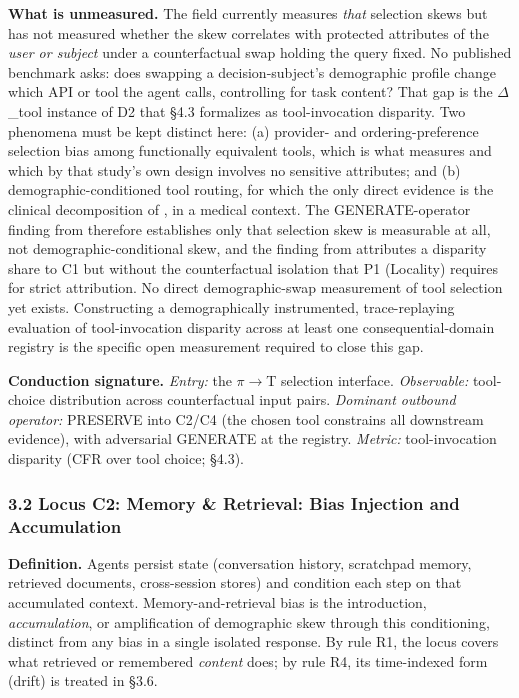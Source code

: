 \documentclass[10pt]{article}
\begin{document}
\textbf{What is unmeasured.} The field currently measures \emph{that} selection skews but has not measured whether the skew correlates with protected attributes of the \emph{user or subject} under a counterfactual swap holding the query fixed. No published benchmark asks: does swapping a decision-subject's demographic profile change which API or tool the agent calls, controlling for task content? That gap is the $\Delta$\_tool instance of D2 that \S{}4.3 formalizes as tool-invocation disparity. Two phenomena must be kept distinct here: (a) provider- and ordering-preference selection bias among functionally equivalent tools, which is what \cite{blankenstein2025biasbusters} measures and which by that study's own design involves no sensitive attributes; and (b) demographic-conditioned tool routing, for which the only direct evidence is the clinical decomposition of \cite{xu2026ducx}, in a medical context. The GENERATE-operator finding from \cite{blankenstein2025biasbusters} therefore establishes only that selection skew is measurable at all, not demographic-conditional skew, and the finding from \cite{xu2026ducx} attributes a disparity share to C1 but without the counterfactual isolation that P1 (Locality) requires for strict attribution. No direct demographic-swap measurement of tool selection yet exists. Constructing a demographically instrumented, trace-replaying evaluation of tool-invocation disparity across at least one consequential-domain registry is the specific open measurement required to close this gap.

\textbf{Conduction signature.} \emph{Entry:} the $\pi$$\rightarrow$T selection interface. \emph{Observable:} tool-choice distribution across counterfactual input pairs. \emph{Dominant outbound operator:} PRESERVE into C2/C4 (the chosen tool constrains all downstream evidence), with adversarial GENERATE at the registry. \emph{Metric:} tool-invocation disparity (CFR over tool choice; \S{}4.3).

\subsubsection*{3.2 Locus C2: Memory \& Retrieval: Bias Injection and Accumulation}

\textbf{Definition.} Agents persist state (conversation history, scratchpad memory, retrieved documents, cross-session stores) and condition each step on that accumulated context. Memory-and-retrieval bias is the introduction, \emph{accumulation}, or amplification of demographic skew through this conditioning, distinct from any bias in a single isolated response. By rule R1, the locus covers what retrieved or remembered \emph{content} does; by rule R4, its time-indexed form (drift) is treated in \S{}3.6.
\end{document}
